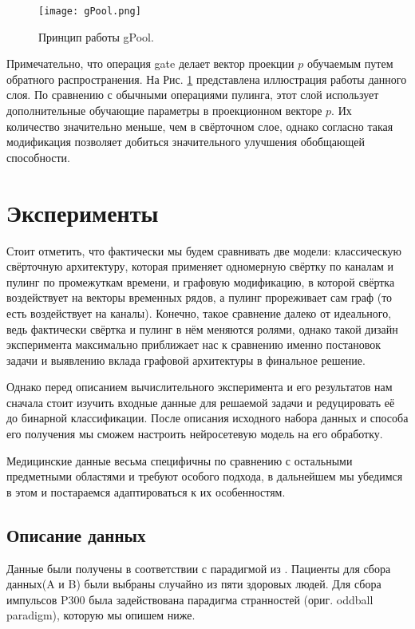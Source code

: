 \documentclass[12pt]{article}
\begin{document}
\begin{figure}[ht]
        \centering
        \texttt{[image: gPool.png]}
        \caption{Принцип работы gPool.}
        \label{gPool}
    \end{figure}

Примечательно, что операция gate делает вектор проекции $p$ обучаемым путем обратного распространения. На Рис. \ref{gPool} представлена иллюстрация работы данного слоя. По сравнению с обычными операциями пулинга, этот слой использует дополнительные обучающие параметры в проекционном векторе $p$. Их количество значительно меньше, чем в свёрточном слое, однако согласно \cite{gao2019graph} такая модификация позволяет добиться значительного улучшения обобщающей способности.

\section{Эксперименты}

Стоит отметить, что фактически мы будем сравнивать две модели: классическую свёрточную архитектуру, которая применяет одномерную свёртку по каналам и пулинг по промежуткам времени, и графовую модификацию, в которой свёртка воздействует на векторы временных рядов, а пулинг прореживает сам граф (то есть воздействует на каналы). Конечно, такое сравнение далеко от идеального, ведь фактически свёртка и пулинг в нём меняются ролями, однако такой дизайн эксперимента максимально приближает нас к сравнению именно постановок задачи и выявлению вклада графовой архитектуры в финальное решение.

Однако перед описанием вычислительного эксперимента и его результатов нам сначала стоит изучить входные данные для решаемой задачи и редуцировать её до бинарной классификации. После описания исходного набора данных и способа его получения мы сможем настроить нейросетевую модель на его обработку. 

Медицинские данные весьма специфичны по сравнению с остальными предметными областями и требуют особого подхода, в дальнейшем мы убедимся в этом и постараемся адаптироваться к их особенностям.

\subsection{Описание данных}
\label{dataset_1_sec}

Данные были получены в соответствии с парадигмой из \cite{schalk2004bci2000}. Пациенты для сбора данных(A и B) были выбраны случайно из пяти здоровых людей. Для сбора импульсов P300 была задействована парадигма странностей (ориг. oddball paradigm), которую мы опишем ниже.
\end{document}
